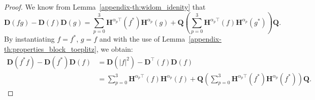 \begin{proof}


We know from Lemma~\ref{appendix-th:widom_idenity} that 
\begin{equation}
    \mathbf{D}(fg) - \mathbf{D}(f)\mathbf{D}(g) = \sum_{p=0}^3 \mathbf{H}^{\alpha_p \top}(f^*) \mathbf{H}^{\alpha_p}(g) + \mathbf{Q} \left( \sum_{p=0}^3 \mathbf{H}^{\alpha_p \top}(f) \mathbf{H}^{\alpha_p}(g^*) \right) \mathbf{Q}.
\end{equation}
By instantiating $f = f^*$, $g = f$ and with the use of Lemma~\ref{appendix-th:properties_block_toeplitz}, we obtain:
\begin{align}
    \mathbf{D}(f^* f) - \mathbf{D}(f^*)\mathbf{D}(f)
    &= \mathbf{D}(|f|^2) - \mathbf{D}^{\top}(f)\mathbf{D}(f) \\
    &= \sum_{p=0}^3 \mathbf{H}^{\alpha_p \top}(f)\mathbf{H}^{\alpha_p}(f) + \mathbf{Q} \left( \sum_{p=0}^3 \mathbf{H}^{\alpha_p \top}(f^*)\mathbf{H}^{\alpha_p} (f^*) \right) \mathbf{Q} . \label{appendix-eq:widom_identity_block_topelitz}
\end{align}


\end{proof}
